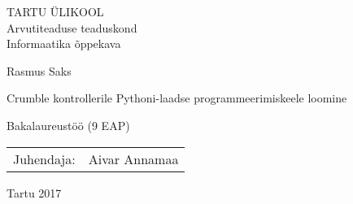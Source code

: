 \documentclass[12pt]{article}
\begin{document}
\thispagestyle{empty}
\begin{center}

\large
TARTU ÜLIKOOL\\[2mm]
Arvutiteaduse teaduskond\\
Informaatika õppekava\\[2mm]

\vspace{25mm}

\Large Rasmus Saks

\vspace{4mm}

\huge Crumble kontrollerile Pythoni-laadse programmeerimiskeele loomine

\vspace{20mm}

\Large Bakalaureustöö (9 EAP)

\end{center}

\vspace{2mm}

\begin{flushright}
 {
 \setlength{\extrarowheight}{5pt}
 \begin{tabular}{r l} 
  \sffamily Juhendaja: & \sffamily Aivar Annamaa
 \end{tabular}
 }
\end{flushright}

\vspace{10mm}

\vspace{2mm}



\vspace{2mm}


\vspace{8mm}


\vfill
\centerline{Tartu 2017}
\end{document}
